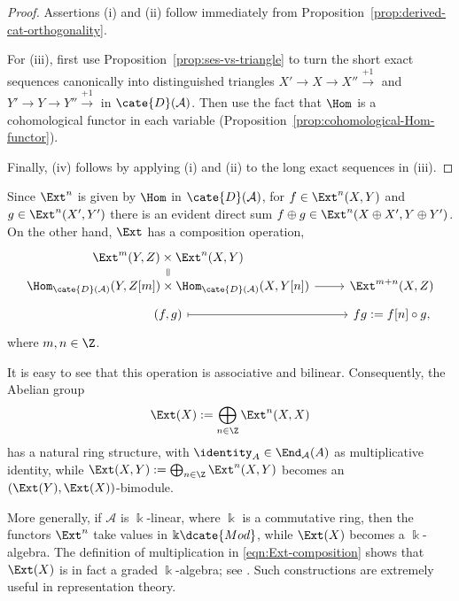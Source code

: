 \begin{proof}
	Assertions (i) and (ii) follow immediately from
	Proposition~\ref{prop:derived-cat-orthogonality}.

	For (iii), first use Proposition~\ref{prop:ses-vs-triangle} to turn the
	short exact sequences canonically into distinguished triangles
	$X'\to X\to X''\xrightarrow{+1}$ and
	$Y'\to Y\to Y''\xrightarrow{+1}$ in $\cate{D}(\mathcal{A})$. Then use
	the fact that $\Hom$ is a cohomological functor in each variable
	(Proposition~\ref{prop:cohomological-Hom-functor}).

	Finally, (iv) follows by applying (i) and (ii) to the long exact sequences
	in (iii).
\end{proof}

Since $\Ext^n$ is given by $\Hom$ in $\cate{D}(\mathcal{A})$, for
$f\in\Ext^n(X,Y)$ and $g\in\Ext^n(X',Y')$ there is an evident direct sum
$f\oplus g\in\Ext^n(X\oplus X',Y\oplus Y')$. On the other hand, $\Ext$
has a composition operation,
\begin{equation}\label{eqn:Ext-composition}\begin{tikzcd}[row sep=tiny]
	\Ext^m(Y, Z) \times \Ext^n(X, Y) \arrow[equal, d] & \\
	\Hom_{\cate{D}(\mathcal{A})}(Y, Z[m]) \times \Hom_{\cate{D}(\mathcal{A})}(X, Y[n]) \arrow[r] & \Ext^{m+n}(X, Z) \\
	(f, g) \arrow[r, mapsto] & fg := f[n] \circ g ,
\end{tikzcd}\end{equation}
where $m,n\in\Z$.

It is easy to see that this operation is associative and bilinear.
Consequently, the Abelian group
\[ \Ext(X):=\bigoplus_{n\in\Z}\Ext^n(X,X) \]
has a natural ring structure, with
$\identity_A\in\End_{\mathcal{A}}(A)$ as multiplicative identity, while
$\Ext(X,Y):=\bigoplus_{n\in\Z}\Ext^n(X,Y)$ becomes an
$(\Ext(Y),\Ext(X))$-bimodule.

More generally, if $\mathcal{A}$ is $\Bbbk$-linear, where $\Bbbk$ is a
commutative ring, then the functors $\Ext^n$ take values in
$\Bbbk\dcate{Mod}$, while $\Ext(X)$ becomes a $\Bbbk$-algebra. The
definition of multiplication in \eqref{eqn:Ext-composition} shows that
$\Ext(X)$ is in fact a graded $\Bbbk$-algebra; see
\cite[Definition~7.4.1]{Li1}. Such constructions are extremely useful in
representation theory.

